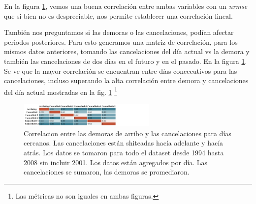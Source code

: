 En la figura \ref{fig:cancell-arrdelay}, vemos una buena correlación
entre ambas variables con un \emph{nrmse} que si bien no es
despreciable, nos permite establecer una correlación lineal.

También nos preguntamos si las demoras o las cancelaciones, podían
afectar periodos posteriores. Para esto generamos una matriz de
correlación, para los mismos datos anteriores, tomando las
cancelaciones del día actual vs la demora y también las cancelaciones
de dos días en el futuro y en el pasado. En la figura
\ref{fig:cancell-arrdelay}. Se ve que la mayor correlación se
encuentran entre días concecutivos para las cancelaciones, incluso
superando la alta correlación entre demora y cancelaciones del día
actual mostradas en la fig. \ref{fig:cancell-arrdelay} \footnote{Las
  métricas no son iguales en ambas figuras.}

\begin{figure}[h]
  \includegraphics[width=0.6\textwidth, height=0.24\textheight]{./img/daily-full-csv-correlation-table.jpg}
  \centering
  \caption{ Correlacion entre las demoras de arribo y las
    cancelaciones para días cercanos. Las cancelaciones están
    shiteadas hacía adelante y hacía atrás. Los datos se tomaron para
    todo el dataset desde 1994 hasta 2008 sin incluir 2001. Los datos
    están agregados por día. Las cancelaciones se sumaron, las demoras
    se promediaron.  }
  \label{fig:cancell-arrdelay}
\end{figure}
